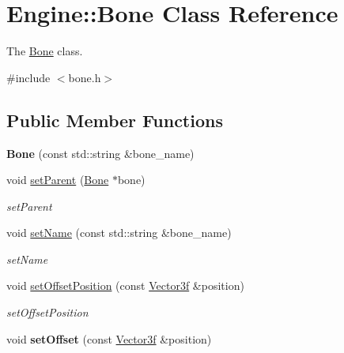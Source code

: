 \hypertarget{classEngine_1_1Bone}{}\section{Engine\+:\+:Bone Class Reference}
\label{classEngine_1_1Bone}


The \hyperlink{classEngine_1_1Bone}{Bone} class.  




{\ttfamily \#include $<$bone.\+h$>$}

\subsection*{Public Member Functions}
\begin{DoxyCompactItemize}
\item 
\hypertarget{classEngine_1_1Bone_a43128067323ee8ca50b8b8ba20ff1d14}{}{\bfseries Bone} (const std\+::string \&bone\+\_\+name)\label{classEngine_1_1Bone_a43128067323ee8ca50b8b8ba20ff1d14}

\item 
void \hyperlink{classEngine_1_1Bone_a8cee234a0f0811bb0ec81266999c87ad}{set\+Parent} (\hyperlink{classEngine_1_1Bone}{Bone} $\ast$bone)
\begin{DoxyCompactList}\small\item\em set\+Parent \end{DoxyCompactList}\item 
void \hyperlink{classEngine_1_1Bone_ad67ca7e8863ae1207a6bbc7b1fb7dcba}{set\+Name} (const std\+::string \&bone\+\_\+name)
\begin{DoxyCompactList}\small\item\em set\+Name \end{DoxyCompactList}\item 
void \hyperlink{classEngine_1_1Bone_a6e1880832768227605594b922bd8cd7d}{set\+Offset\+Position} (const \hyperlink{classVector3}{Vector3f} \&position)
\begin{DoxyCompactList}\small\item\em set\+Offset\+Position \end{DoxyCompactList}\item 
\hypertarget{classEngine_1_1Bone_aa9fa7c60c56aafcf4574c2cad701d2f8}{}void {\bfseries set\+Offset} (const \hyperlink{classVector3}{Vector3f} \&position)\label{classEngine_1_1Bone_aa9fa7c60c56aafcf4574c2cad701d2f8}


\end{DoxyCompactItemize}
